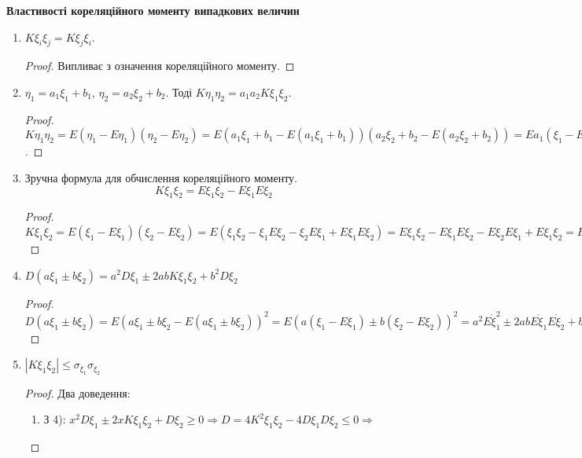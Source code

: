 \noindent \textbf{Властивості кореляційного моменту випадкових 
величин}
\begin{enumerate}
    \item $K\xi_i\xi_j = K\xi_j\xi_i$.
    \begin{proof}
        Випливає з означення кореляційного моменту.
    \end{proof}
    \item $\eta_1 = a_1\xi_1 + b_1$, $\eta_2 = a_2\xi_2 + b_2$.
    Тоді $K\eta_1\eta_2 = a_1a_2K\xi_1\xi_2$.
    \begin{proof}
        $K\eta_1\eta_2 = E(\eta_1 - E\eta_1)(\eta_2 - E\eta_2) = 
        E(a_1\xi_1 + b_1 - E(a_1\xi_1 + b_1))
        (a_2\xi_2 + b_2 - E(a_2\xi_2 + b_2)) = 
        Ea_1(\xi_1 - E\xi_1)a_2(\xi_2 - E\xi_2) = 
        a_1a_2E(\xi_1 - E\xi_1)(\xi_2 - E\xi_2) = 
        a_1a_2K\xi_1\xi_2$.
    \end{proof}

    \item Зручна формула для обчислення кореляційного моменту.
    \begin{equation}
        K\xi_1\xi_2 = E\xi_1\xi_2 - E\xi_1 E\xi_2
    \end{equation}
    \begin{proof}
        $K\xi_1\xi_2 = E(\xi_1 - E\xi_1)(\xi_2 - E\xi_2) = 
        E(\xi_1\xi_2 - \xi_1E\xi_2 - \xi_2E\xi_1 + E\xi_1E\xi_2) = 
        E\xi_1\xi_2 - E\xi_1E\xi_2 - E\xi_2E\xi_1 + E\xi_1\xi_2 = 
        E\xi_1\xi_2 - E\xi_1E\xi_2$
    \end{proof}
    
    \item $D(a\xi_1 \pm b\xi_2) = a^2D\xi_1 \pm 2abK\xi_1\xi_2 + 
    b^2D\xi_2$

    \begin{proof}
        $D(a\xi_1 \pm b\xi_2) = 
        E(a\xi_1 \pm b\xi_2 - E(a\xi_1 \pm b\xi_2))^2 =
        E(a(\xi_1-E\xi_1)\pm b(\xi_2 - E\xi_2))^2 = 
        a^2 E\mathring{\xi}_1^2 \pm 2abE\mathring{\xi}_1 E\mathring{\xi} _2 
        + b^2 E\mathring{\xi}_2^2 = 
        a^2D\xi_1 \pm 2abK\xi_1\xi_2 + b^2D\xi_2$
    \end{proof}

    \item $\left|K\xi_1\xi_2\right| \leq \sigma_{\xi_1} \sigma_{\xi_2}$
    \begin{proof}
        Два доведення: 

        \begin{enumerate}
            \item З 4): $x^2 D\xi_1 \pm2xK\xi_1\xi_2 + D\xi_2 \geq 0 
            \Rightarrow D = 4K^2\xi_1\xi_2 - 4D\xi_1D\xi_2 \leq 0 
            \Rightarrow $


\end{enumerate}
\end{proof}
\end{enumerate}
